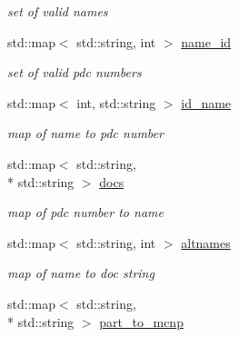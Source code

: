 \begin{DoxyCompactItemize}
\begin{DoxyCompactList}\small\item\em set of valid names \end{DoxyCompactList}\item 
\hypertarget{namespacepyne_1_1particle_a649721d363b978995fb05f8007e4ecfb}{std\+::map$<$ std\+::string, int $>$ \hyperlink{namespacepyne_1_1particle_a649721d363b978995fb05f8007e4ecfb}{name\+\_\+id}}\label{namespacepyne_1_1particle_a649721d363b978995fb05f8007e4ecfb}

\begin{DoxyCompactList}\small\item\em set of valid pdc numbers \end{DoxyCompactList}\item 
\hypertarget{namespacepyne_1_1particle_adfacb4f56580ef9aa94b6cf6970ac366}{std\+::map$<$ int, std\+::string $>$ \hyperlink{namespacepyne_1_1particle_adfacb4f56580ef9aa94b6cf6970ac366}{id\+\_\+name}}\label{namespacepyne_1_1particle_adfacb4f56580ef9aa94b6cf6970ac366}

\begin{DoxyCompactList}\small\item\em map of name to pdc number \end{DoxyCompactList}\item 
\hypertarget{namespacepyne_1_1particle_a1134f614fd50d48b1583634857ebc775}{std\+::map$<$ std\+::string, \\*
std\+::string $>$ \hyperlink{namespacepyne_1_1particle_a1134f614fd50d48b1583634857ebc775}{docs}}\label{namespacepyne_1_1particle_a1134f614fd50d48b1583634857ebc775}

\begin{DoxyCompactList}\small\item\em map of pdc number to name \end{DoxyCompactList}\item 
\hypertarget{namespacepyne_1_1particle_a848d7127667430bd7fa3896ea4145639}{std\+::map$<$ std\+::string, int $>$ \hyperlink{namespacepyne_1_1particle_a848d7127667430bd7fa3896ea4145639}{altnames}}\label{namespacepyne_1_1particle_a848d7127667430bd7fa3896ea4145639}

\begin{DoxyCompactList}\small\item\em map of name to doc string \end{DoxyCompactList}\item 
\hypertarget{namespacepyne_1_1particle_ab46830f83783c4230c4d30a290d8c5fc}{std\+::map$<$ std\+::string, \\*
std\+::string $>$ \hyperlink{namespacepyne_1_1particle_ab46830f83783c4230c4d30a290d8c5fc}{part\+\_\+to\+\_\+mcnp}}\label{namespacepyne_1_1particle_ab46830f83783c4230c4d30a290d8c5fc}


\end{DoxyCompactItemize}
